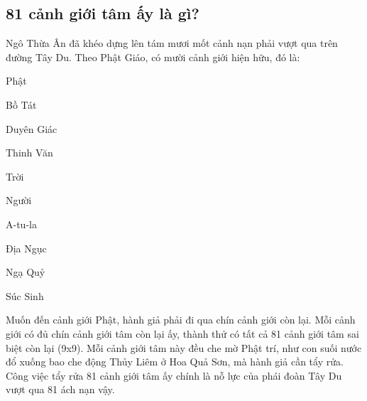 \subsection{81 cảnh giới tâm ấy là gì?} %
\label{sub:81_canh_gioi_tam}

Ngô Thừa Ân đã khéo dựng lên tám mươi mốt cảnh nạn phải vượt qua trên đường Tây Du. Theo Phật Giáo, có mười cảnh giới hiện hữu, đó là:

\begin{multicols}{2}
\begin{newenumerate}
    \item Phật
    \item Bồ Tát
    \item Duyên Giác
    \item Thinh Văn
    \item Trời
    \item Người
    \item A-tu-la
    \item Địa Ngục
    \item Ngạ Quỷ
    \item Súc Sinh
\end{newenumerate}
\end{multicols}

Muốn đến cảnh giới Phật, hành giả phải đi qua chín cảnh giới còn lại. Mỗi cảnh giới có đủ chín cảnh giới tâm còn lại ấy, thành thử có tất cả 81 cảnh giới tâm sai biệt còn lại (9x9). Mỗi cảnh giới tâm này đều che mờ Phật trí, như con suối nước đổ xuống bao che động Thủy Liêm ở Hoa Quả Sơn, mà hành giả cần tẩy rửa. Công việc tẩy rửa 81 cảnh giới tâm ấy chính là nỗ lực của phái đoàn Tây Du vượt qua 81 ách nạn vậy.
